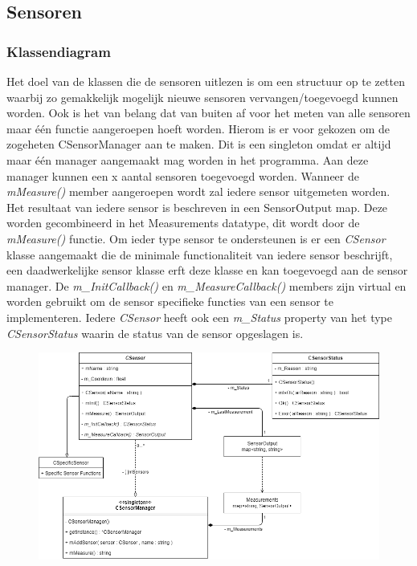 \subsection{Sensoren}
\subsubsection{Klassendiagram}
Het doel van de klassen die de sensoren uitlezen is om een structuur op te zetten waarbij zo gemakkelijk mogelijk nieuwe sensoren vervangen/toegevoegd kunnen worden. Ook is het van belang dat van buiten af voor het meten van alle sensoren maar één functie aangeroepen hoeft worden. Hierom is er voor gekozen om de zogeheten CSensorManager aan te maken. Dit is een singleton omdat er altijd maar één manager aangemaakt mag worden in het programma. Aan deze manager kunnen een x aantal sensoren toegevoegd worden.
\vspace{1em}
Wanneer de \emph{mMeasure()} member aangeroepen wordt zal iedere sensor uitgemeten worden. Het resultaat van iedere sensor is beschreven in een SensorOutput map. Deze worden gecombineerd in het Measurements datatype, dit wordt door de \emph{mMeasure()} functie.
\vspace{1em}
Om ieder type sensor te ondersteunen is er een \emph{CSensor} klasse aangemaakt die de minimale functionaliteit van iedere sensor beschrijft, een daadwerkelijke sensor klasse erft deze klasse en kan toegevoegd aan de sensor manager. De \emph{m\_InitCallback()} en \emph{m\_MeasureCallback()} members zijn virtual en worden gebruikt om de sensor specifieke functies van een sensor te implementeren. Iedere \emph{CSensor} heeft ook een \emph{m\_Status} property van het type \emph{CSensorStatus} waarin de status van de sensor opgeslagen is.

\begin{figure}[H]
  \centering
  \includegraphics[width=\columnwidth]{uml/sensor-abstraction.png}
\end{figure}

